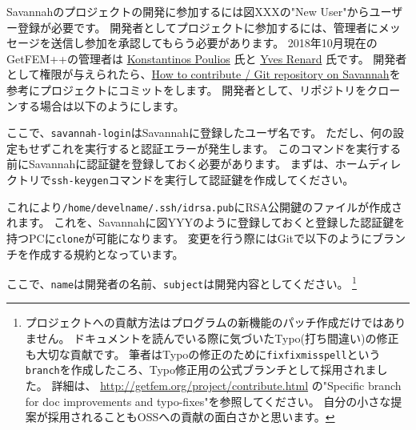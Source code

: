 \documentclass{../../style/ltjoc}
\begin{document}
Savannahのプロジェクトの開発に参加するには図XXXの"New User"からユーザー登録が必要です。
開発者としてプロジェクトに参加するには、管理者にメッセージを送信し参加を承認してもらう必要があります。
2018年10月現在のGetFEM++の管理者は \href{http://www.dtu.dk/english/service/phonebook/person?id=65472&tab=2&qt=dtupublicationquery}{Konstantinos Poulios} 氏と \href{http://math.univ-lyon1.fr/~renard/}{Yves Renard} 氏です。
開発者として権限が与えられたら、\href{http://getfem.org/project/index.html}{How to contribute / Git repository on Savannah}を参考にプロジェクトにコミットをします。
開発者として、リポジトリをクローンする場合は以下のようにします。
\begin{shbox}
\end{shbox}
ここで、\texttt{savannah-login}はSavannahに登録したユーザ名です。
ただし、何の設定もせずこれを実行すると認証エラーが発生します。
このコマンドを実行する前にSavannahに認証鍵を登録しておく必要があります。
まずは、ホームディレクトリで\texttt{ssh-keygen}コマンドを実行して認証鍵を作成してください。
\begin{shbox}
  \shline{}{}
\end{shbox}
これにより\texttt{/home/develname/.ssh/id\textunderscore{}rsa.pub}にRSA公開鍵のファイルが作成されます。
これを、Savannahに図YYYのように登録しておくと登録した認証鍵を持つPCに\texttt{clone}が可能になります。
変更を行う際にはGitで以下のようにブランチを作成する規約となっています。
\begin{shbox}
\end{shbox}
ここで、\texttt{name}は開発者の名前、\texttt{subject}は開発内容としてください。
\footnote{
プロジェクトへの貢献方法はプログラムの新機能のパッチ作成だけではありません。
ドキュメントを読んでいる際に気づいたTypo(打ち間違い)の修正も大切な貢献です。
筆者はTypoの修正のために\texttt{fixfixmisspell}という\texttt{branch}を作成したころ、Typo修正用の公式ブランチとして採用されました。
詳細は、 \href{http://getfem.org/project/contribute.html}{http://getfem.org/project/contribute.html} の"Specific branch for doc improvements and typo-fixes"を参照してください。
自分の小さな提案が採用されることもOSSへの貢献の面白さかと思います。
}
\end{document}

